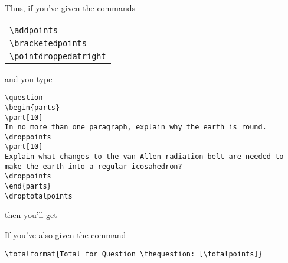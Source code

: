 \documentclass[12pt]{exam}
\begin{document}
Thus, if you've given the commands 
\begin{center}
  \begin{tabular}{l}
    \verb"\addpoints"\\
    \verb"\bracketedpoints"\\
    \verb"\pointdroppedatright"
  \end{tabular}
\end{center}
and you type
\begin{verbatim}
\question
\begin{parts}
\part[10]
In no more than one paragraph, explain why the earth is round.
\droppoints
\part[10]
Explain what changes to the van Allen radiation belt are needed to
make the earth into a regular icosahedron?
\droppoints
\end{parts}
\droptotalpoints
\end{verbatim}
then you'll get
\addpoints
\pointsdroppedatright
\bracketedpoints
\begin{questions}
\question
{}
  \leavevmode\unskip\nobreak\hfill
\makeatletter
\makeatother
  \par
\end{questions}
\noaddpoints
\nopointsinmargin
\nobracketedpoints
If you've also given the command
\begin{center}
  \verb"\totalformat{Total for Question \thequestion: [\totalpoints]}"
\end{center}
\end{document}
